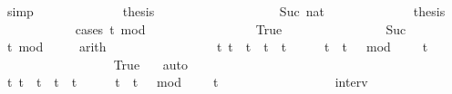 \begin{isabellebody}
\ simp\isanewline
\ \ \ \ \ \ \ \ \ \ \isamarkupfalse%
\ \isamarkupfalse%
\ {\isacharquery}thesis\ \isacommand{{\isachardot}}\isamarkupfalse%
\ \isanewline
\ \ \ \ \ \ \isamarkupfalse%
\isanewline
\ \ \ \ \ \ \ \ \isamarkupfalse%
\ {\isacharparenleft}Suc\ nat{\isacharparenright}\isanewline
\ \ \ \ \ \ \ \ \ \ \isamarkupfalse%
\ \isamarkupfalse%
\ {\isacharquery}thesis\isanewline
\ \ \ \ \ \ \ \ \ \ \isamarkupfalse%
\ {\isacharparenleft}cases\ {\isacartoucheopen}{\isacharparenleft}t\ mod\ {}\ {\isacharequal}\ {}{\isacartoucheclose}{\isacharparenright}\isanewline
\ \ \ \ \ \ \ \ \ \ \ \ \isamarkupfalse%
\ True\isanewline
\ \ \ \ \ \ \ \ \ \ \ \ \ \ \isamarkupfalse%
\ Suc\ \isamarkupfalse%
\ {\isacartoucheopen}t\ mod\ {}\ {\isasymnoteq}\ {}{\isacartoucheclose}\ \isamarkupfalse%
\ arith\ \isanewline
\ \ \ \ \ \ \ \ \ \ \ \ \ \ \isamarkupfalse%
\ {\isacartoucheopen}{\isacharbraceleft}t{\isachardot}\ {\isacharparenleft}t\ {\isacharequal}\ t\ {\isasymor}\ t\ {\isacharequal}\ t\ {\isacharplus}\ {}{\isacharparenright}\ {\isasymand}\ {}\ {\isasymle}\ t\ {\isasymand}\ {\isacharparenleft}t\ {\isacharminus}\ {}{\isacharparenright}\ mod\ {}\ {\isacharequal}\ {}{\isacharbraceright}\ {\isacharequal}\ {\isacharbraceleft}t\isanewline
\ \ \ \ \ \ \ \ \ \ \ \ \ \ \ \ \isamarkupfalse%
\ True\ \ \isamarkupfalse%
\ auto\isanewline
\ \ \ \ \ \ \ \ \ \ \ \ \ \ \isamarkupfalse%
\ {\isacartoucheopen}{\isacharbraceleft}t{\isachardot}\ t\ {\isasymle}\ t\ {\isasymand}\ t\ {\isacharless}\ t\ {\isacharplus}\ {}\ {\isasymand}\ {}\ {\isasymle}\ t\ {\isasymand}\ {\isacharparenleft}t\ {\isacharminus}\ {}{\isacharparenright}\ mod\ {}\ {\isacharequal}\ {}{\isacharbraceright}\ {\isacharequal}\ {\isacharbraceleft}t\isanewline
\ \ \ \ \ \ \ \ \ \ \ \ \ \ \ \ \isamarkupfalse%
\ interv{\isacharunderscore}{}\ \isamarkupfalse%

\end{isabellebody}
